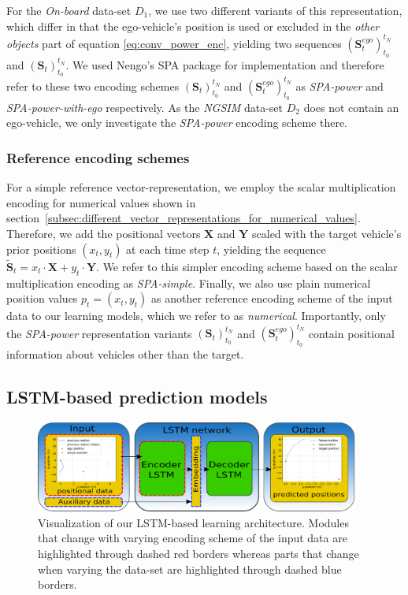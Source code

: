For the \emph{On-board} data-set $D_1$, we use two different variants of this representation, which differ in that the ego-vehicle's position is used or excluded in the \emph{other objects} part of equation \eqref{eq:conv_power_enc}, yielding two sequences $(\mathbf{S}_{t}^{ego})_{t_0}^{t_N}$ and $(\mathbf{S}_{t})_{t_0}^{t_N}$.
We used \acs{Nengo}'s \ac{SPA} package for implementation and therefore refer to these two encoding schemes $(\mathbf{S}_{t})_{t_0}^{t_N}$ and $(\mathbf{S}_{t}^{ego})_{t_0}^{t_N}$ as \emph{\ac{SPA}-power} and \emph{\ac{SPA}-power-with-ego} respectively.
As the \emph{\ac{NGSIM}} data-set $D_2$ does not contain an ego-vehicle, we only investigate the \emph{\ac{SPA}-power} encoding scheme there.

\subsubsection{Reference encoding schemes}%
\label{ssubsec:reference_encoding_schemes}

For a simple reference vector-representation, we employ the scalar multiplication encoding for numerical values shown in section~\ref{subsec:different_vector_representations_for_numerical_values}.
Therefore, we add the positional vectors $\mathbf{X}$ and $\mathbf{Y}$ scaled with the target vehicle's prior positions $(x_{t}, y_{t})$ at each time step $t$, yielding the sequence $\tilde{\mathbf{S}}_{t} =  x_{t} \cdot \mathbf{X} + y_{t}\cdot \mathbf{Y}$.
We refer to this simpler encoding scheme based on the scalar multiplication encoding as \emph{\ac{SPA}-simple}.
Finally, we also use plain numerical position values $p_t = (x_{t}, y_{t})$ as another reference encoding scheme of the input data to our learning models, which we refer to as \emph{numerical}.
Importantly, only the \emph{\ac{SPA}-power} representation variants $(\mathbf{S}_{t})_{t_0}^{t_N}$ and $(\mathbf{S}_{t}^{ego})_{t_0}^{t_N}$ contain positional information about vehicles other than the target.

\subsection{\acs{LSTM}-based prediction models}%
\label{subsec:lstm_based_prediction_models}

\begin{figure}[t!]
  \centering
  \includegraphics[width=0.95\textwidth]{imgs/lstm_arch.eps}
  \caption{Visualization of our \ac{LSTM}-based learning architecture. Modules that change with varying encoding scheme of the input data are highlighted through dashed red borders whereas parts that change when varying the data-set are highlighted through dashed blue borders.}\label{fig:lstm_arch}
\end{figure}

